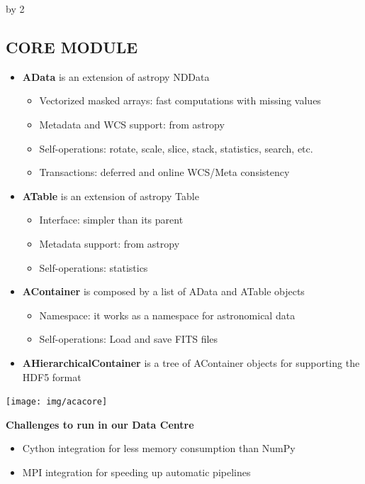 \documentclass[11pt]{scrartcl}
\def\anzspalten{2}
\newlength{\kastenwidth}
\newenvironment{kasten}{
  \begin{lrbox}{\dummybox}
    \begin{minipage}{\linewidth}}
    {\end{minipage}
  \end{lrbox}
  \raisebox{-\depth}{\psshadowbox[cornersize=absolute,linearc=14pt,framesep=1em]{\usebox{\dummybox}}}\\[0.5em]}
\newenvironment{spalte}{
  \setlength\kastenwidth{1.2\textwidth}
  \divide\kastenwidth by \anzspalten
  \begin{minipage}[t]{\kastenwidth}}{\end{minipage}}
\begin{document}
\begin{lrbox}{\spalten}
{\begin{spalte}
\begin{kasten}
        \section*{\hspace{0.2cm} {\color{red} CORE MODULE} }
			\begin{minipage}{0.57\linewidth}
\begin{itemize}
\item \textbf{AData} is an extension of astropy NDData
\begin{itemize}
\item Vectorized masked arrays: fast computations with missing values 
\item Metadata and WCS support: from astropy
\item Self-operations: rotate, scale, slice, stack, statistics, search, etc.
\item Transactions: deferred and online WCS/Meta consistency
\end{itemize}
\item \textbf{ATable} is an extension of astropy Table
\begin{itemize}
\item Interface: simpler than its parent
\item Metadata support: from astropy
\item Self-operations: statistics
\end{itemize}
\item \textbf{AContainer} is composed by a list of AData and ATable objects
\begin{itemize}
\item Namespace: it works as a namespace for astronomical data
\item Self-operations: Load and save FITS files
\end{itemize}
\item \textbf{AHierarchicalContainer} is a tree of AContainer objects for
supporting the HDF5 format
\end{itemize}
			\end{minipage}
 \hfill
			\begin{minipage}{0.40\textwidth}
			\begin{center}
                        	\texttt{[image: img/acacore]}
			\end{center}
\textbf{Challenges to run in our Data Centre} 
\begin{itemize}
\item Cython integration for less memory consumption than NumPy
\item MPI integration for speeding up automatic pipelines
\end{itemize}
          \end{minipage}


\end{kasten}
\end{spalte}}
\end{lrbox}
\end{document}
